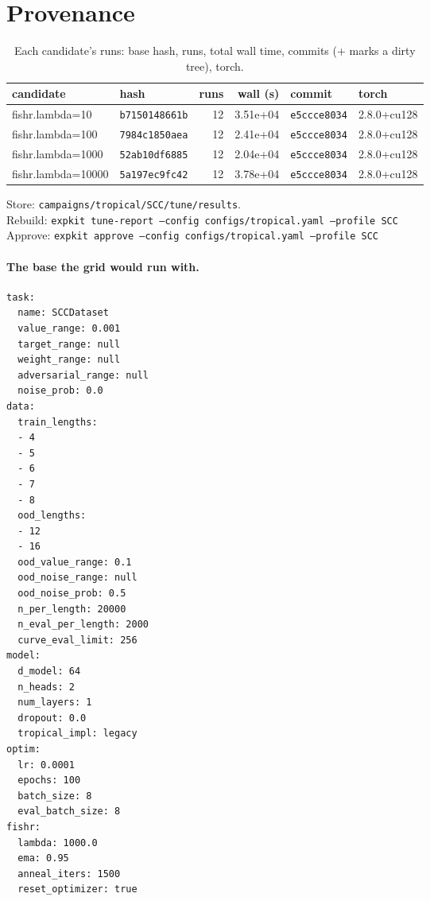 \documentclass[10pt]{article}
\begin{document}
\section{Provenance}
{\small
\begin{longtable}{llrrll}
\caption{Each candidate's runs: base hash, runs, total wall time, commits (+ marks a dirty tree), torch.}\label{tab:provenance}\\
\toprule
candidate & hash & runs & wall (s) & commit & torch\\
\midrule
\endhead
fishr.lambda=10 & \texttt{b7150148661b} & 12 & 3.51e+04 & \texttt{e5ccce8034} & 2.8.0+cu128\\
fishr.lambda=100 & \texttt{7984c1850aea} & 12 & 2.41e+04 & \texttt{e5ccce8034} & 2.8.0+cu128\\
fishr.lambda=1000 & \texttt{52ab10df6885} & 12 & 2.04e+04 & \texttt{e5ccce8034} & 2.8.0+cu128\\
fishr.lambda=10000 & \texttt{5a197ec9fc42} & 12 & 3.78e+04 & \texttt{e5ccce8034} & 2.8.0+cu128\\
\bottomrule
\end{longtable}
}
\noindent Store: \texttt{campaigns/tropical/SCC/tune/results}.\\
Rebuild: \texttt{expkit tune-report --config configs/tropical.yaml --profile SCC}\\
Approve: \texttt{expkit approve --config configs/tropical.yaml --profile SCC}

\paragraph{The base the grid would run with.}
{\footnotesize
\begin{verbatim}
task:
  name: SCCDataset
  value_range: 0.001
  target_range: null
  weight_range: null
  adversarial_range: null
  noise_prob: 0.0
data:
  train_lengths:
  - 4
  - 5
  - 6
  - 7
  - 8
  ood_lengths:
  - 12
  - 16
  ood_value_range: 0.1
  ood_noise_range: null
  ood_noise_prob: 0.5
  n_per_length: 20000
  n_eval_per_length: 2000
  curve_eval_limit: 256
model:
  d_model: 64
  n_heads: 2
  num_layers: 1
  dropout: 0.0
  tropical_impl: legacy
optim:
  lr: 0.0001
  epochs: 100
  batch_size: 8
  eval_batch_size: 8
fishr:
  lambda: 1000.0
  ema: 0.95
  anneal_iters: 1500
  reset_optimizer: true
\end{verbatim}
}

\clearpage
\appendix
\end{document}
